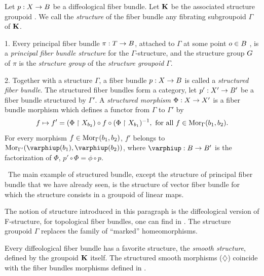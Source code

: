 \begin{article}
  \label{Structures-on-fiber-bundles}
  Let $p : X \to B$ be a diffeological fiber bundle.
  Let ${\mathbf K}$ be the associated structure groupoid .
  We call the {\em structure} of the fiber bundle any fibrating subgroupoid $\Gamma$ of ${\mathbf K}$.
  
  1. Every principal fiber bundle $\pi : T \to B$,
  attached to $\Gamma$ at some point $o \in B$ ,
  is a {\em principal fiber bundle structure} for the $\Gamma$-structure,
  and the structure group $G$ of $\pi$ is the {\em structure group} of the {\em structure groupoid} $\Gamma$.
  
  2. Together with a structure $\Gamma$,
  a fiber bundle $p : X \to B$ is called a {\em structured fiber bundle}.
  The structured fiber bundles form a category,
  let $p': X' \to B'$ be a fiber bundle structured by $\Gamma'$.
  A {\em structured morphism} $\Phi : X \to X'$ is a fiber bundle morphism  which defines a functor from $\Gamma$ to $\Gamma'$ by
  \begin{equation}
    \renewcommand{\theequation}{$\diamondsuit$}
    f \mapsto f' = (\Phi \restriction \X_{b_2}) \circ f \circ (\Phi \restriction \X_{b_1})^{-1},
    \text{ for all } f \in \Mor_\Gamma(b_1,b_2).
  \end{equation}
  For every morphism $f \in {\operatorname{Mor}}_{\Gamma}(b_1,b_2)$,
  $f'$ belongs to $\Mor_{\Gamma'}(\phi(b_1),\phi(b_2))$,
  where $\phi : \B \to \B'$ is the factorization of $\Phi$, $p'\circ \Phi = \phi \circ p$.
  
  \Example~The main example of structured bundle,
  except the structure of principal fiber bundle that we have already seen,
  is the structure of vector fiber bundle for which the structure consists in a groupoid of linear maps.
  
   The notion of structure introduced in this paragraph is the diffeological version of F-structure,
  for topological fiber bundles,
  one can find in \cite{FR81}.
  The structure groupoid $\Gamma$ replaces the family of ``marked'' homeomorphisms.
  
   Every diffeological fiber bundle has a favorite structure,
  the {\em smooth structure},
  defined by the groupoid ${\mathbf K}$ itself.
  The structured smooth morphisms ($\diamondsuit$) coincide with the fiber bundles morphisms defined in .
  

\end{article}
